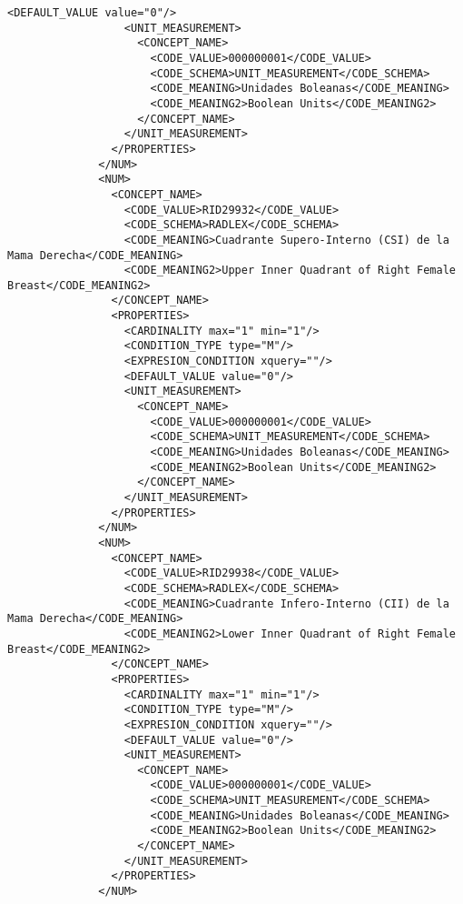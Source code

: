 \begin{lstlisting}[label=some-code,caption=Some Code]
                  <DEFAULT_VALUE value="0"/>
                  <UNIT_MEASUREMENT>
                    <CONCEPT_NAME>
                      <CODE_VALUE>000000001</CODE_VALUE>
                      <CODE_SCHEMA>UNIT_MEASUREMENT</CODE_SCHEMA>
                      <CODE_MEANING>Unidades Boleanas</CODE_MEANING>
                      <CODE_MEANING2>Boolean Units</CODE_MEANING2>
                    </CONCEPT_NAME>
                  </UNIT_MEASUREMENT>
                </PROPERTIES>
              </NUM>
              <NUM>
                <CONCEPT_NAME>
                  <CODE_VALUE>RID29932</CODE_VALUE>
                  <CODE_SCHEMA>RADLEX</CODE_SCHEMA>
                  <CODE_MEANING>Cuadrante Supero-Interno (CSI) de la Mama Derecha</CODE_MEANING>
                  <CODE_MEANING2>Upper Inner Quadrant of Right Female Breast</CODE_MEANING2>
                </CONCEPT_NAME>
                <PROPERTIES>
                  <CARDINALITY max="1" min="1"/>
                  <CONDITION_TYPE type="M"/>
                  <EXPRESION_CONDITION xquery=""/>
                  <DEFAULT_VALUE value="0"/>
                  <UNIT_MEASUREMENT>
                    <CONCEPT_NAME>
                      <CODE_VALUE>000000001</CODE_VALUE>
                      <CODE_SCHEMA>UNIT_MEASUREMENT</CODE_SCHEMA>
                      <CODE_MEANING>Unidades Boleanas</CODE_MEANING>
                      <CODE_MEANING2>Boolean Units</CODE_MEANING2>
                    </CONCEPT_NAME>
                  </UNIT_MEASUREMENT>
                </PROPERTIES>
              </NUM>
              <NUM>
                <CONCEPT_NAME>
                  <CODE_VALUE>RID29938</CODE_VALUE>
                  <CODE_SCHEMA>RADLEX</CODE_SCHEMA>
                  <CODE_MEANING>Cuadrante Infero-Interno (CII) de la Mama Derecha</CODE_MEANING>
                  <CODE_MEANING2>Lower Inner Quadrant of Right Female Breast</CODE_MEANING2>
                </CONCEPT_NAME>
                <PROPERTIES>
                  <CARDINALITY max="1" min="1"/>
                  <CONDITION_TYPE type="M"/>
                  <EXPRESION_CONDITION xquery=""/>
                  <DEFAULT_VALUE value="0"/>
                  <UNIT_MEASUREMENT>
                    <CONCEPT_NAME>
                      <CODE_VALUE>000000001</CODE_VALUE>
                      <CODE_SCHEMA>UNIT_MEASUREMENT</CODE_SCHEMA>
                      <CODE_MEANING>Unidades Boleanas</CODE_MEANING>
                      <CODE_MEANING2>Boolean Units</CODE_MEANING2>
                    </CONCEPT_NAME>
                  </UNIT_MEASUREMENT>
                </PROPERTIES>
              </NUM>

\end{lstlisting}
